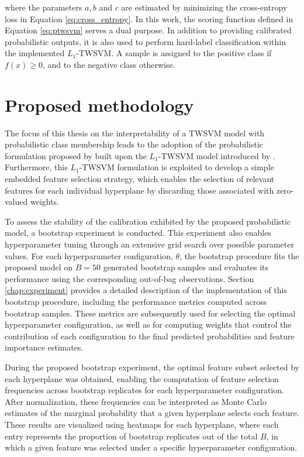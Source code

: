 \documentclass[12pt]{report} %
\begin{document}
where the parameters $a, b$ and $c$ are estimated by minimizing the cross-entropy loss in Equation \ref{eq:cross_entropy}. In this work, the scoring function defined in Equation \ref{eq:ptwsvm} serves a dual purpose. In addition to providing calibrated probabilistic outputs, it is also used to perform hard-label classification within the implemented $L_1$-TWSVM. A sample is assigned to the positive class if $f(x) \geq 0$, and to the negative class otherwise.



\chapter{Proposed methodology} \label{chap:methodology}

The focus of this thesis on the interpretability of a TWSVM model with probabilistic class membership leads to the adoption of the probabilistic formulation proposed by \cite{shao2012probabilistic} built upon the $L_1$-TWSVM model introduced by \cite{bai2014novel}. Furthermore, this $L_1$-TWSVM formulation is exploited to develop a simple embedded feature selection strategy, which enables the selection of relevant features for each individual hyperplane by discarding those associated with zero-valued weights.

To assess the stability of the calibration exhibited by the proposed probabilistic model, a bootstrap experiment is conducted. This experiment also enables hyperparameter tuning through an extensive grid search over possible parameter values. For each hyperparameter configuration, $\theta$, the bootstrap procedure fits the proposed model on $B = 50$ generated bootstrap samples and evaluates its performance using the corresponding out-of-bag observations. Section \ref{chap:experiment} provides a detailed description of the implementation of this bootstrap procedure, including the performance metrics computed across bootstrap samples. These metrics are subsequently used for selecting the optimal hyperparameter configuration, as well as for computing weights that control the contribution of each configuration to the final predicted probabilities and feature importance estimates.

During the proposed bootstrap experiment, the optimal feature subset selected by each hyperplane was obtained, enabling the computation of feature selection frequencies across bootstrap replicates for each hyperparameter configuration. After normalization, these frequencies can be interpreted as Monte Carlo estimates of the marginal probability that a given hyperplane selects each feature. These results are visualized using heatmaps for each hyperplane, where each entry represents the proportion of bootstrap replicates out of the total $B$, in which a given feature was selected under a specific hyperparameter configuration.
\end{document}
